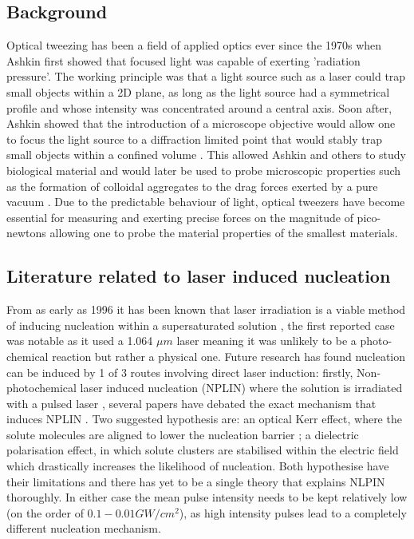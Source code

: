 \subsection{Background}
Optical tweezing has been a field of applied optics ever since the 1970s when Ashkin \cite{Ashkin1970} first showed that focused light was capable of exerting 'radiation pressure'. The working principle was that a light source such as a laser could trap small objects within a 2D plane, as long as the light source had a symmetrical profile and whose intensity was concentrated around a central axis. Soon after, Ashkin showed that the introduction of a microscope objective would allow one to focus the light source to a diffraction limited point that would stably trap small objects within a confined volume \cite{Ashkin1980}. This allowed Ashkin and others to study biological material and would later be used to probe microscopic properties such as the formation of colloidal aggregates \cite{Yi2021} to the drag forces exerted by a pure vacuum \cite{Ahn2018, Monteiro2018}. Due to the predictable behaviour of light, optical tweezers have become essential for measuring and exerting precise forces on the magnitude of pico-newtons allowing one to probe the material properties of the smallest materials. 

\subsection{Literature related to laser induced nucleation}
From as early as 1996 it has been known that laser irradiation is a viable method of inducing nucleation within a supersaturated solution \cite{Garetz1996}, the first reported case was notable as it used a 1.064 $\mu m$ laser meaning it was unlikely to be a photo-chemical reaction but rather a physical one. Future research has found nucleation can be induced by 1 of 3 routes involving direct laser induction: firstly, Non-photochemical laser induced nucleation (NPLIN) where the solution is irradiated with a pulsed laser \cite{Garetz1996, Garetz2002,Sun2006}, several papers have debated the exact mechanism that induces NPLIN \cite{Garetz2002, Knott2011}. Two suggested hypothesis are: an optical Kerr effect, where the solute molecules are aligned to lower the nucleation barrier \cite{Knott2011}; a dielectric polarisation effect, in which solute clusters are stabilised within the electric field which drastically increases the likelihood of nucleation\cite{Alexander2008}. Both hypothesise have their limitations and there has yet to be a single theory that explains NLPIN thoroughly. In either case the mean pulse intensity needs to be kept relatively low (on the order of $0.1-0.01 GW/cm^2$), as high intensity pulses lead to a completely different nucleation mechanism.

